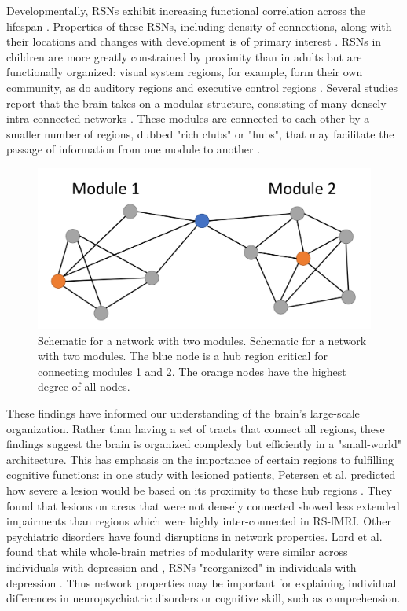 Developmentally, RSNs exhibit increasing functional correlation across the lifespan \cite{Kesler2013, Uddin2010}. Properties of these RSNs, including density of connections, along with their locations and changes with development is of primary interest  \cite{Cole2014, Dosenbach2007, Fair2009}. RSNs in children are more greatly constrained by proximity than in adults but are functionally organized: visual system regions, for example, form their own community, as do auditory regions and executive control regions \cite{Seeley2007}. Several studies report that the brain takes on a modular structure, consisting of many densely intra-connected networks \cite{Bullmore2009, Fair2009, Supekar2009, Dosenbach2007}. These modules are connected to each other by a smaller number of regions, dubbed "rich clubs" or "hubs", that may facilitate the passage of information from one module to another \cite{Power2013, Bullmore2012}. 

\begin{figure}[t]
    \centering
    \includegraphics[width=14cm]{images/ch1-graph-schema.png}
    \caption{Schematic for a network with two modules. Schematic for a network with two modules. The blue node is a hub region critical for connecting modules 1 and 2. The orange nodes have the highest degree of all nodes.}
\end{figure}

These findings have informed our understanding of the brain's large-scale organization. Rather than having a set of tracts that connect all regions, these findings suggest the brain is organized complexly but efficiently in a "small-world" architecture. This has emphasis on the importance of certain regions to fulfilling cognitive functions: in one study with lesioned patients, Petersen et al. predicted how severe a lesion would be based on its proximity to these hub regions \cite{Warren2014}. They found that lesions on areas that were not densely connected showed less extended impairments than regions which were highly inter-connected in RS-fMRI. Other psychiatric disorders have found disruptions in network properties. Lord et al. found that while whole-brain metrics of modularity were similar across individuals with depression and , RSNs "reorganized" in individuals with depression \cite{Lord2012}. Thus network properties may be important for explaining individual differences in neuropsychiatric disorders or cognitive skill, such as comprehension. 


